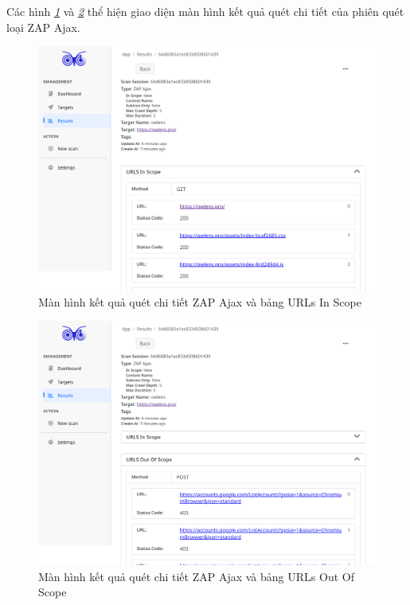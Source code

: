 Các hình \textit{\ref{fig:ManHinhKetQuaQuetChiTietAjaxVaURLsInScope} } 
và \textit{\ref{fig:ManHinhKetQuaQuetChiTietAjaxVaURLsOutOfScope} } 
thể hiện giao diện màn hình kết quả quét chi tiết của phiên quét loại ZAP Ajax.

\begin{figure}[H]
      \centering
      \includegraphics[width=\textwidth]{applied-thesis-chapters/chapter-6/Màn hình kết quả quét chi tiết ZAP Ajax và bảng URLs In Scope.png}
      \caption{Màn hình kết quả quét chi tiết ZAP Ajax và bảng URLs In Scope}
      \label{fig:ManHinhKetQuaQuetChiTietAjaxVaURLsInScope}
\end{figure}

\begin{figure}[H]
      \centering
      \includegraphics[width=\textwidth]{applied-thesis-chapters/chapter-6/Màn hình kết quả quét chi tiết ZAP Ajax và bảng URLs Out Of Scope.png}
      \caption{Màn hình kết quả quét chi tiết ZAP Ajax và bảng URLs Out Of Scope}
      \label{fig:ManHinhKetQuaQuetChiTietAjaxVaURLsOutOfScope}
\end{figure}

